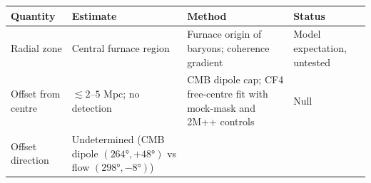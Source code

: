 \documentclass[
]{article}
\begin{document}
\begin{longtable}[]{@{}llll@{}}
\toprule
\begin{minipage}[b]{0.22\columnwidth}\raggedright
Quantity\strut
\end{minipage} & \begin{minipage}[b]{0.22\columnwidth}\raggedright
Estimate\strut
\end{minipage} & \begin{minipage}[b]{0.22\columnwidth}\raggedright
Method\strut
\end{minipage} & \begin{minipage}[b]{0.22\columnwidth}\raggedright
Status\strut
\end{minipage}\tabularnewline
\midrule
\endhead
\begin{minipage}[t]{0.22\columnwidth}\raggedright
Radial zone\strut
\end{minipage} & \begin{minipage}[t]{0.22\columnwidth}\raggedright
Central furnace region\strut
\end{minipage} & \begin{minipage}[t]{0.22\columnwidth}\raggedright
Furnace origin of baryons; coherence gradient\strut
\end{minipage} & \begin{minipage}[t]{0.22\columnwidth}\raggedright
Model expectation, untested\strut
\end{minipage}\tabularnewline
\begin{minipage}[t]{0.22\columnwidth}\raggedright
Offset from centre\strut
\end{minipage} & \begin{minipage}[t]{0.22\columnwidth}\raggedright
\(\lesssim 2\)--\(5\) Mpc; no detection\strut
\end{minipage} & \begin{minipage}[t]{0.22\columnwidth}\raggedright
CMB dipole cap; CF4 free-centre fit with mock-mask and 2M++
controls\strut
\end{minipage} & \begin{minipage}[t]{0.22\columnwidth}\raggedright
Null\strut
\end{minipage}\tabularnewline
\begin{minipage}[t]{0.22\columnwidth}\raggedright
Offset direction\strut
\end{minipage} & \begin{minipage}[t]{0.22\columnwidth}\raggedright
Undetermined (CMB dipole \((264°,+48°)\) vs flow \((298°,-8°)\))\strut
\end{minipage} & \begin{minipage}[t]{0.22\columnwidth}\raggedright

\end{minipage}
\end{longtable}
\end{document}
